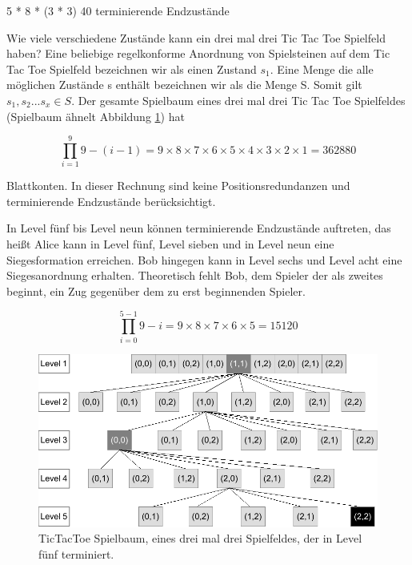 5 * 8 * (3 * 3)
40 terminierende Endzustände

Wie viele verschiedene Zustände kann ein drei mal drei Tic Tac Toe Spielfeld haben?
Eine beliebige regelkonforme Anordnung von Spielsteinen auf dem Tic Tac Toe Spielfeld bezeichnen wir als einen Zustand $s_1$. Eine Menge die alle möglichen Zustände s enthält bezeichnen wir als die Menge S. Somit gilt $s_1, s_2 ... s_x \in S$. Der gesamte Spielbaum eines drei mal drei Tic Tac Toe Spielfeldes (Spielbaum ähnelt Abbildung \ref{fig:drei_mal_drei_tictactoe_spielbaum}) hat
 
\begin{equation}
\prod_{i=1}^{9} 9 - (i - 1) = 9 \times 8 \times 7 \times 6 \times 5 \times 4 \times 3 \times 2 \times 1 = 362880
\end{equation}

Blattkonten. In dieser Rechnung sind keine Positionsredundanzen und terminierende Endzustände berücksichtigt.

In Level fünf bis Level neun können terminierende Endzustände auftreten, das heißt Alice kann in Level fünf, Level sieben und in Level neun eine Siegesformation erreichen. Bob hingegen kann in Level sechs und Level acht eine Siegesanordnung erhalten. Theoretisch fehlt Bob, dem Spieler der als zweites beginnt, ein Zug gegenüber dem zu erst beginnenden Spieler.  

\begin{equation}
\prod_{i=0}^{5 - 1} 9 - i = 9 \times 8 \times 7 \times 6 \times 5 = 15120
\end{equation}



\begin{figure}[!htbp]
  \centering
  \includegraphics[scale = 1]{inhalt/abbildungen/suchbaum_drei_mal_drei_tictactoe.pdf}
  \caption{TicTacToe Spielbaum, eines drei mal drei Spielfeldes, der in Level fünf terminiert.}
  \label{fig:drei_mal_drei_tictactoe_spielbaum}
\end{figure}

